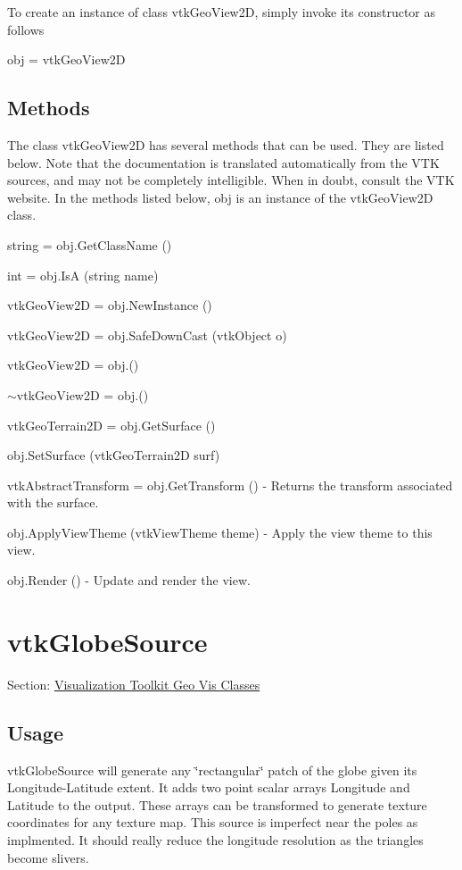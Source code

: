 To create an instance of class vtk\-Geo\-View2\-D, simply invoke its constructor as follows \begin{DoxyVerb}  obj = vtkGeoView2D
\end{DoxyVerb}
 \hypertarget{vtkwidgets_vtkxyplotwidget_Methods}{}\subsection{Methods}\label{vtkwidgets_vtkxyplotwidget_Methods}
The class vtk\-Geo\-View2\-D has several methods that can be used. They are listed below. Note that the documentation is translated automatically from the V\-T\-K sources, and may not be completely intelligible. When in doubt, consult the V\-T\-K website. In the methods listed below, {\ttfamily obj} is an instance of the vtk\-Geo\-View2\-D class. 
\begin{DoxyItemize}
\item {\ttfamily string = obj.\-Get\-Class\-Name ()}  
\item {\ttfamily int = obj.\-Is\-A (string name)}  
\item {\ttfamily vtk\-Geo\-View2\-D = obj.\-New\-Instance ()}  
\item {\ttfamily vtk\-Geo\-View2\-D = obj.\-Safe\-Down\-Cast (vtk\-Object o)}  
\item {\ttfamily vtk\-Geo\-View2\-D = obj.()}  
\item {\ttfamily $\sim$vtk\-Geo\-View2\-D = obj.()}  
\item {\ttfamily vtk\-Geo\-Terrain2\-D = obj.\-Get\-Surface ()}  
\item {\ttfamily obj.\-Set\-Surface (vtk\-Geo\-Terrain2\-D surf)}  
\item {\ttfamily vtk\-Abstract\-Transform = obj.\-Get\-Transform ()} -\/ Returns the transform associated with the surface.  
\item {\ttfamily obj.\-Apply\-View\-Theme (vtk\-View\-Theme theme)} -\/ Apply the view theme to this view.  
\item {\ttfamily obj.\-Render ()} -\/ Update and render the view.  
\end{DoxyItemize}\hypertarget{vtkgeovis_vtkglobesource}{}\section{vtk\-Globe\-Source}\label{vtkgeovis_vtkglobesource}
Section\-: \hyperlink{sec_vtkgeovis}{Visualization Toolkit Geo Vis Classes} \hypertarget{vtkwidgets_vtkxyplotwidget_Usage}{}\subsection{Usage}\label{vtkwidgets_vtkxyplotwidget_Usage}
vtk\-Globe\-Source will generate any \char`\"{}rectangular\char`\"{} patch of the globe given its Longitude-\/\-Latitude extent. It adds two point scalar arrays Longitude and Latitude to the output. These arrays can be transformed to generate texture coordinates for any texture map. This source is imperfect near the poles as implmented. It should really reduce the longitude resolution as the triangles become slivers.

